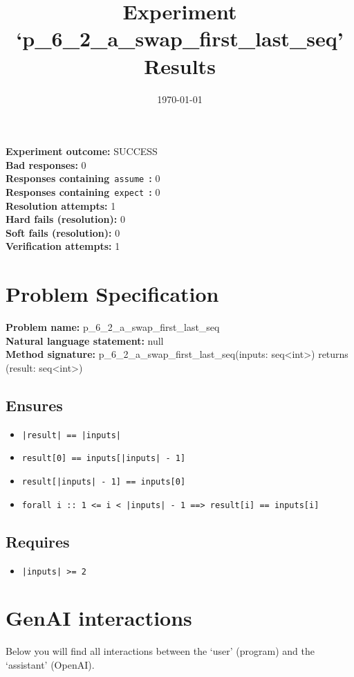 \documentclass{article}
\begin{document}
\title{Experiment `p\_6\_2\_a\_swap\_first\_last\_seq' Results}
\author{\today}
\date{}
\maketitle
\textbf{Experiment outcome: }SUCCESS
\\\textbf{Bad responses: }0
\\\textbf{Responses containing}~\texttt{assume}~\textbf{: }0
\\\textbf{Responses containing}~\texttt{expect}~\textbf{: }0
\\\textbf{Resolution attempts: }1
\\\textbf{Hard fails (resolution): }0
\\\textbf{Soft fails (resolution): }0
\\\textbf{Verification attempts: }1
\section*{Problem Specification}
\textbf{Problem name: }p\_6\_2\_a\_swap\_first\_last\_seq
\\\textbf{Natural language statement: }null
\\\textbf{Method signature: }p\_6\_2\_a\_swap\_first\_last\_seq(inputs: seq<int>) returns (result: seq<int>)
\subsection*{Ensures}
\begin{itemize}
\item \texttt{|result| == |inputs|}
\item \texttt{result[0] == inputs[|inputs| - 1]}
\item \texttt{result[|inputs| - 1] == inputs[0]}
\item \texttt{forall i :: 1 <= i < |inputs| - 1 ==> result[i] == inputs[i]}
\end{itemize}
\subsection*{Requires}
\begin{itemize}
\item \texttt{|inputs| >= 2}
\end{itemize}
\clearpage
\section*{GenAI interactions}
Below you will find all interactions between the `user' (program) and the `assistant' (OpenAI).
\end{document}
